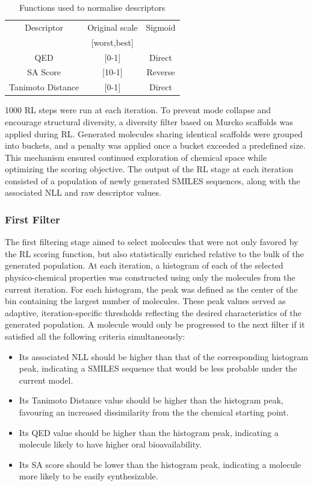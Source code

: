 \documentclass[letterpaper]{article}
\begin{document}
\begin{table}[H]
  \caption{Functions used to normalise descriptors}
  \label{tab:rl_descriptors}
  \centering
  \begin{tabular}{ccc}
    \hline
    Descriptor & Original scale & Sigmoid\\
               & [worst,best]   &        \\
    \hline
    QED & [0-1] & Direct \\
    SA Score & [10-1] & Reverse \\
    Tanimoto Distance & [0-1] & Direct \\
    \hline
  \end{tabular}
\end{table}

1000 RL steps were run at each iteration. To prevent mode collapse and encourage structural diversity, a diversity filter based on Murcko scaffolds was applied during RL. Generated molecules sharing identical scaffolds were grouped into buckets, and a penalty was applied once a bucket exceeded a predefined size. This mechanism ensured continued exploration of chemical space while optimizing the scoring objective. The output of the RL stage at each iteration consisted of a population of newly generated SMILES sequences, along with the associated NLL and raw descriptor values. 

\subsubsection{First Filter}
The first filtering stage aimed to select molecules that were not only favored by the RL scoring function, but also statistically enriched relative to the bulk of the generated population. At each iteration, a histogram of each of the selected physico-chemical properties was constructed using only the molecules from the current iteration. For each histogram, the peak was defined as the center of the bin containing the largest number of molecules. These peak values served as adaptive, iteration-specific thresholds reflecting the desired characteristics of the generated population. A molecule would only be progressed to the next filter if it satisfied all the following criteria simultaneously:
\begin{itemize}
    \item Its associated NLL should be higher than that of the corresponding histogram peak, indicating a SMILES sequence that would be less probable under the current model.
    \item Its Tanimoto Distance value should be higher than the histogram peak, favouring an increased dissimilarity from the the chemical starting point.
    \item Its QED value should be higher than the histogram peak, indicating  a molecule likely to have higher oral bioavailability.
    \item Its SA score should be lower than the histogram peak, indicating a molecule more likely to be easily synthesizable.
\end{itemize}
\end{document}
